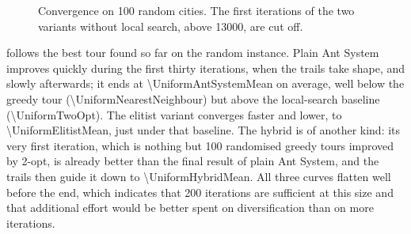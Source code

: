 \documentclass[11pt,a4paper]{article}
\newcommand{\mean}[1]{\num[round-mode=places,round-precision=1]{#1}}
\begin{document}
\begin{figure}[htbp]
    \centering
    \caption{Convergence on 100 random cities. The first iterations of the two variants
        without local search, above \num{13000}, are cut off.}
    \label{fig:convergence}
\end{figure}

 follows the best tour found so far on the random instance. Plain
Ant System improves quickly during the first thirty iterations, when the trails take
shape, and slowly afterwards; it ends at \mean{\UniformAntSystemMean} on average, well below
the greedy tour (\num{\UniformNearestNeighbour}) but above the
local-search baseline (\num{\UniformTwoOpt}). The elitist variant
converges faster and lower, to \mean{\UniformElitistMean}, just under that baseline. The
hybrid is of another kind: its very first iteration, which is nothing but 100 randomised
greedy tours improved by 2-opt, is already better than the final result of plain Ant
System, and the trails then guide it down to \mean{\UniformHybridMean}. All three curves flatten well
before the end, which indicates that 200 iterations are sufficient at this size and that
additional effort would be better spent on diversification than on more iterations.
\end{document}
